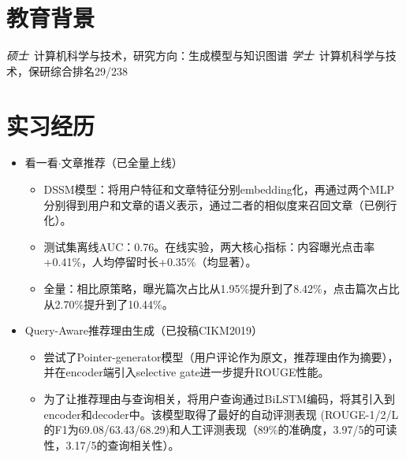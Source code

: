 \documentclass{resume}
\begin{document}


 
\section{教育背景}
\textit{硕士}\ 计算机科学与技术，研究方向：生成模型与知识图谱
\textit{学士}\ 计算机科学与技术，保研综合排名29/238

\section{实习经历}
\begin{itemize}
\item 看一看$\cdot$文章推荐（已全量上线）
\begin{itemize}
\item DSSM模型：将用户特征和文章特征分别embedding化，再通过两个MLP分别得到用户和文章的语义表示，通过二者的相似度来召回文章（已例行化）。
\item 测试集离线AUC：0.76。在线实验，两大核心指标：内容曝光点击率+0.41\%，人均停留时长+0.35\%（均显著）。
\item 全量：相比原策略，曝光篇次占比从1.95\%提升到了8.42\%，点击篇次占比从2.70\%提升到了10.44\%。
\end{itemize}
\end{itemize}

\begin{itemize}
\item Query-Aware推荐理由生成（已投稿CIKM2019）
\begin{itemize}
\item 尝试了Pointer-generator模型（用户评论作为原文，推荐理由作为摘要），并在encoder端引入selective gate进一步提升ROUGE性能。
\item 为了让推荐理由与查询相关，将用户查询通过BiLSTM编码，将其引入到encoder和decoder中。该模型取得了最好的自动评测表现 (ROUGE-1/2/L的F1为69.08/63.43/68.29)和人工评测表现（89\%的准确度，3.97/5的可读性，3.17/5的查询相关性）。
\end{itemize}
\end{itemize}
\end{document}
